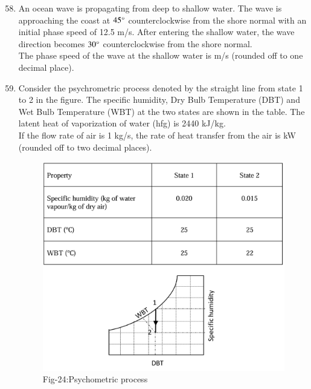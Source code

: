 \documentclass[journal]{IEEEtran}
\theoremstyle{remark}
\begin{document}
\begin{enumerate}[itemsep=1em]
\setcounter{enumi}{57}
\item An ocean wave is propagating from deep to shallow water. The wave is approaching the coast at $45\degree$ counterclockwise from the shore normal with an initial phase speed of 12.5 m/s. After entering the shallow water, the wave direction becomes $30\degree$ counterclockwise from the shore normal. \\
The phase speed of the wave at the shallow water is \underline{\hspace{2cm}} m/s (rounded off to one decimal place). 
\end{enumerate}

\begin{enumerate}[itemsep=1em]
\setcounter{enumi}{58}
\item Consider the psychrometric process denoted by the straight line from state 1 to 2 in the figure. The specific humidity, Dry Bulb Temperature (DBT) and Wet Bulb Temperature (WBT) at the two states are shown in the table. The latent heat of vaporization of water (hfg) is 2440 kJ/kg. \\  
If the flow rate of air is 1 kg/s, the rate of heat transfer from the air is \underline{\hspace{2cm}} kW (rounded off to two decimal places). 
\begin{figure}[H]
    \centering
    \includegraphics[width=0.6\columnwidth]{figs/fig-24.jpeg}
    \caption*{Fig-24:Psychometric process}
    \label{fig:24}
\end{figure}
\end{enumerate}
\newpage
\vspace*{0.25cm}
\end{document}
